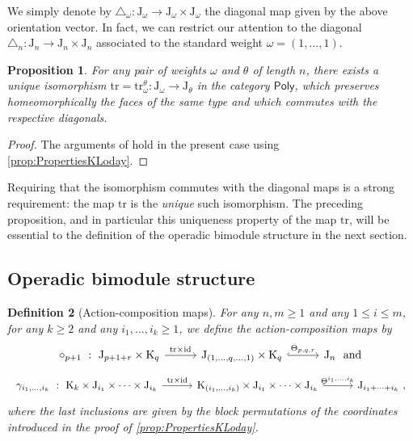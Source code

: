 \documentclass[twoside, 12pt]{amsart}
\newtheorem{definition}{Definition}[section]
\newtheorem{proposition}[definition]{Proposition}
\theoremstyle{remark}
\newcommand{\K}{\mathrm{K}}
\newcommand{\J}{\mathrm{J}}
\newcommand{\PolySub}{\mathsf{Poly}}
\newcommand{\tr}{\mathrm{tr}}
\newcommand{\id}{\mathrm{id}}
\begin{document}
We simply denote by $\triangle_\omega : \J_\omega\to \J_\omega \times \J_\omega$ the diagonal map given by the above orientation vector. 
In fact, we can restrict our attention to the diagonal $\triangle_n : \J_n \to \J_n\times \J_n$ associated to the standard weight $\omega=(1, \ldots, 1)$.

\begin{proposition}
For any pair of weights $\omega$ and $\theta$ of length $n$, there exists a unique isomorphism 
$\tr=\tr_\omega^\theta : \J_\omega \to \J_\theta$ in the category $\PolySub$,  
which preserves homeomorphically the faces of the same type and which commutes with the respective diagonals.
\end{proposition}

\begin{proof}
The arguments of \cite[Sections~3.1-3.2]{MTTV19} hold in the present case using \cref{prop:PropertiesKLoday}. 
\end{proof}

Requiring that the isomorphism commutes with the diagonal maps is a strong requirement: the map $\tr$ is the \emph{unique} such isomorphism. 
The preceding proposition, and in particular this uniqueness property of the map $\tr$, will be essential to the definition of the operadic bimodule structure in the next section. 

\subsection{Operadic bimodule structure}

\begin{definition}[Action-composition maps]
For any $n,m\geq 1$ and any $1\leq i \leq m$, for any $k\geq 2$ and any $i_1,\ldots,i_k \geq 1$, we define the \emph{action-composition maps}  by 
\[
\vcenter{\hbox{
\begin{tikzcd}[column sep=1cm]
\circ_{p+1}\ : \ \J_{p+1+r}\times \K_q
\arrow[r,  "\tr\times \id"]
& \J_{(1,\ldots,q,\ldots,1)}\times \K_q 
\arrow[r,hookrightarrow, "\Theta_{p,q,r}"]
&
\J_{n}\ \ \text{and}
\end{tikzcd}
}}
\]
\[
\vcenter{\hbox{
\begin{tikzcd}[column sep=1cm]
\gamma_{i_1,\ldots,i_k}\ : \ \K_{k}\times \J_{i_1} \times \cdots \times \J_{i_k}
\arrow[r,  "\tr\times \id"]
& \K_{(i_1,\ldots,i_k)} \times \J_{i_1} \times \cdots \times \J_{i_k} 
\arrow[r,hookrightarrow, "\Theta^{i_1, \ldots , i_k}"]
&
\J_{i_1+\cdots + i_k}\ , 
\end{tikzcd}
}}
\]
where the last inclusions are given by the block permutations of the coordinates introduced in the proof of \cref{prop:PropertiesKLoday}. 
\end{definition}
\end{document}

